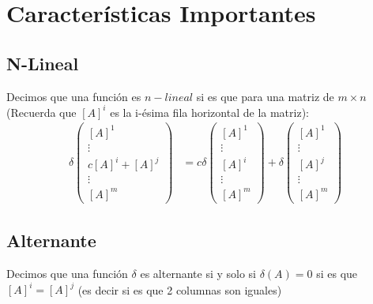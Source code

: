 \documentclass[12pt, fleqn]{report}                             %
\theoremstyle{break}                                            %
\newcommand{\Brackets}[1]       {\left[ #1 \right]}             %
\newcommand{\pVector}[1]                                        %
        { \ensuremath{\begin{pmatrix}#1\end{pmatrix}} }             %
\begin{document}
        \section{Características Importantes}


            \subsection{N-Lineal}

                Decimos que una función es $n-lineal$ si es que para una matriz de $m \times n$
                (Recuerda que $[A]^i$ es la i-ésima fila horizontal de la matriz):
                \begin{align*}
                    \delta\pVector{\Brackets{A}^1 \\ \vdots \\ c\Brackets{A}^i + \Brackets{A}^j \\ \vdots \\ \Brackets{A}^m}
                        &= c
                        \delta\pVector{\Brackets{A}^1 \\ \vdots \\ \Brackets{A}^i \\ \vdots \\ \Brackets{A}^m}
                        + \delta\pVector{\Brackets{A}^1 \\ \vdots \\ \Brackets{A}^j \\ \vdots \\ \Brackets{A}^m}
                \end{align*}


            \vspace{1em}
            \subsection{Alternante}

                Decimos que una función $\delta$ es alternante si y solo si $\delta(A) = 0$
                si es que $[A]^i = [A]^j$ (es decir si es que 2 columnas son iguales)
\end{document}
